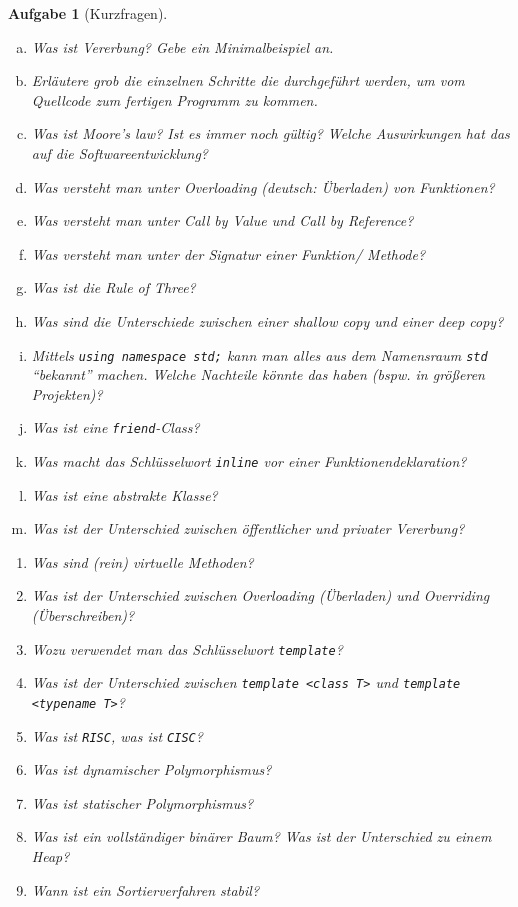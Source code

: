 \documentclass[a4paper,12pt,parskip=full]{scrartcl}
\theoremstyle{exercise}
\newtheorem{exercise}{Aufgabe}
\begin{document}
\begin{exercise}[Kurzfragen]
\begin{enumerate}[a)]
\item Was ist Vererbung? Gebe ein Minimalbeispiel an.
\item Erläutere grob die einzelnen Schritte die durchgeführt werden,
  um vom Quellcode zum fertigen Programm zu kommen.
\item Was ist Moore's law? Ist es immer noch gültig? Welche
  Auswirkungen hat das auf die Softwareentwicklung?
\item Was versteht man unter Overloading (deutsch: Überladen) von
  Funktionen?
\item Was versteht man unter \emph{Call by Value} und \emph{Call by
    Reference}?
\item Was versteht man unter der Signatur einer Funktion/ Methode?
\item Was ist die Rule of Three?
\item Was sind die Unterschiede zwischen einer \emph{shallow copy} und
  einer \emph{deep copy}?
\item Mittels \lstinline{using namespace std;} kann man alles aus dem
  Namensraum \lstinline{std} ``bekannt'' machen. Welche Nachteile
  könnte das haben (bspw. in größeren Projekten)?
\item Was ist eine \lstinline{friend}-Class?
\item Was macht das Schlüsselwort \lstinline{inline} vor einer
  Funktionendeklaration?
\item Was ist eine abstrakte Klasse?
\item Was ist der Unterschied zwischen öffentlicher und privater
  Vererbung?
\end{enumerate}
\begin{enumerate}[aa)]
\item Was sind (rein) virtuelle Methoden?
\item Was ist der Unterschied zwischen Overloading (Überladen) und
  Overriding (Überschreiben)?
\item Wozu verwendet man das Schlüsselwort \lstinline{template}?
\item Was ist der Unterschied zwischen \lstinline{template <class T>}
  und \lstinline{template <typename T>}?
\item Was ist \texttt{RISC}, was ist \texttt{CISC}?
\item Was ist dynamischer Polymorphismus?
\item Was ist statischer Polymorphismus?
\item Was ist ein vollständiger binärer Baum? Was ist der Unterschied
  zu einem Heap?
\item Wann ist ein Sortierverfahren stabil?
\end{enumerate}
\end{exercise}
\newpage
\end{document}
